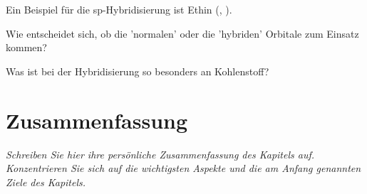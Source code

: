Ein Beispiel für die sp-Hybridisierung ist Ethin (,  ).

\begin{questions} 
\item Wie entscheidet sich, ob die 'normalen' oder die 'hybriden' Orbitale zum Einsatz kommen?
\item Was ist bei der  Hybridisierung  so besonders an Kohlenstoff?
\end{questions}


\section{Zusammenfassung}

\textit{Schreiben Sie hier ihre persönliche Zusammenfassung des Kapitels auf. Konzentrieren Sie sich auf die wichtigsten Aspekte und die am Anfang genannten Ziele des Kapitels.}

\vspace*{10cm}

\printbibliography[segment=\therefsegment,heading=subbibliography]
